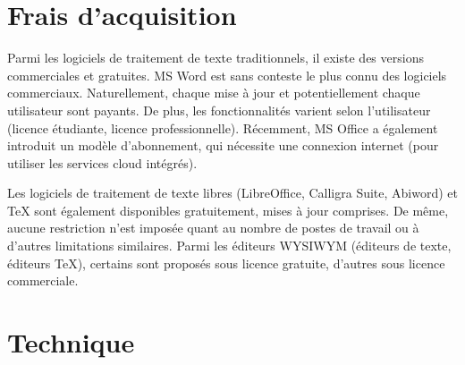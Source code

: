 \documentclass[11pt,a4paper,ngerman,french,DIV=8]{scrartcl}
\begin{document}
\section{Frais d'acquisition}

Parmi les logiciels de traitement de texte traditionnels, il existe des versions commerciales et gratuites. MS Word est sans conteste le plus connu des logiciels commerciaux. Naturellement, chaque mise à jour et potentiellement chaque utilisateur sont payants. De plus, les fonctionnalités varient selon l'utilisateur (licence étudiante, licence professionnelle). Récemment, MS Office a également introduit un modèle d'abonnement, qui nécessite une connexion internet (pour utiliser les services cloud intégrés).

Les logiciels de traitement de texte libres (LibreOffice, Calligra Suite, Abiword) et \TeX{} sont également disponibles gratuitement, mises à jour comprises. De même, aucune restriction n'est imposée quant au nombre de postes de travail ou à d'autres limitations similaires. Parmi les éditeurs WYSIWYM (éditeurs de texte, éditeurs \TeX{}), certains sont proposés sous licence gratuite, d'autres sous licence commerciale.

\section{Technique}
\end{document}
